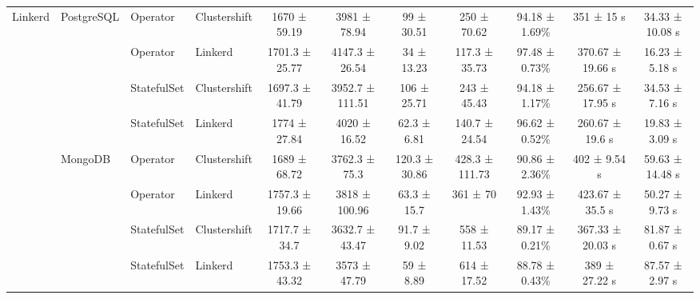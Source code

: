 \begin{table}[tb]
{\begin{tabular}{@{}lll l cccc ccc@{}}
      \multirow{8}{*}{Linkerd}
        & \multirow{4}{*}{PostgreSQL}
          & Operator    & Clustershift & 1670 ± 59.19 & 3981 ± 78.94 & 99 ± 30.51 & 250 ± 70.62 & 94.18 ± 1.69\% & 351 ± 15 s & 34.33 ± 10.08 s \\
              &                                             & Operator    & Linkerd & 1701.3 ± 25.77 & 4147.3 ± 26.54 & 34 ± 13.23 & 117.3 ± 35.73 & 97.48 ± 0.73\% & 370.67 ± 19.66 s & 16.23 ± 5.18 s \\
              &                                             & StatefulSet    & Clustershift & 1697.3 ± 41.79 & 3952.7 ± 111.51 & 106 ± 25.71 & 243 ± 45.43 & 94.18 ± 1.17\% & 256.67 ± 17.95 s & 34.53 ± 7.16 s \\
              &                                             & StatefulSet    & Linkerd & 1774 ± 27.84 & 4020 ± 16.52 & 62.3 ± 6.81 & 140.7 ± 24.54 & 96.62 ± 0.52\% & 260.67 ± 19.6 s & 19.83 ± 3.09 s \\
        \cmidrule(lr){2-11}
              & \multirow{4}{*}{MongoDB}
          & Operator    & Clustershift & 1689 ± 68.72 & 3762.3 ± 75.3 & 120.3 ± 30.86 & 428.3 ± 111.73 & 90.86 ± 2.36\% & 402 ± 9.54 s & 59.63 ± 14.48 s \\
              &                                             & Operator    & Linkerd & 1757.3 ± 19.66 & 3818 ± 100.96 & 63.3 ± 15.7 & 361 ± 70 & 92.93 ± 1.43\% & 423.67 ± 35.5 s & 50.27 ± 9.73 s \\
              &                                             & StatefulSet    & Clustershift & 1717.7 ± 34.7 & 3632.7 ± 43.47 & 91.7 ± 9.02 & 558 ± 11.53 & 89.17 ± 0.21\% & 367.33 ± 20.03 s & 81.87 ± 0.67 s \\
              &                                             & StatefulSet    & Linkerd & 1753.3 ± 43.32 & 3573 ± 47.79 & 59 ± 8.89 & 614 ± 17.52 & 88.78 ± 0.43\% & 389 ± 27.22 s & 87.57 ± 2.97 s \\
      \midrule


\end{tabular}}
\end{table}
